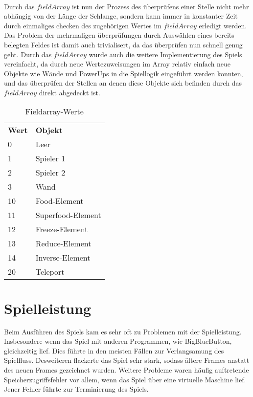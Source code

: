 \\
Durch das $fieldArray$ ist nun der Prozess des {\"u}berpr{\"u}fens einer Stelle nicht mehr abh{\"a}ngig von der L{\"a}nge der Schlange, sondern kann immer in konstanter Zeit durch einmaliges checken des zugeh{\"o}rigen Wertes im $fieldArray$ erledigt werden. Das Problem der mehrmaligen {\"u}berpr{\"u}fungen durch Ausw{\"a}hlen eines bereits belegten Feldes ist damit auch trivialisert, da das {\"u}berpr{\"u}fen nun schnell genug geht. Durch das $fieldArray$ wurde auch die weitere Implementierung des Spiels vereinfacht, da durch neue Wertezuweisungen im Array relativ einfach neue Objekte wie W{\"a}nde und PowerUps in die Spiellogik eingef{\"u}hrt werden konnten, und das {\"u}berpr{\"u}fen der Stellen an denen diese Objekte sich befinden durch das $fieldArray$ direkt abgedeckt ist.
%

\begin{table}
     \centering
     \begin{tabular}{ll}
       \textbf{Wert}  & \textbf{Objekt} \\
       0          & Leer                 \\
       1         & Spieler 1             \\
       2         & Spieler 2             \\
       3         & Wand                 \\
       10        & Food-Element             \\
       11        & Superfood-Element             \\
       12        & Freeze-Element             \\
       13        & Reduce-Element             \\
       14        & Inverse-Element             \\
       20        & Teleport             \\
     \end{tabular}

     \caption{Fieldarray-Werte}
     \label{tbl:Fieldarray-Werte}

   \end{table}




%
\section{Spielleistung}
\label{Spielleistung}
%
Beim Ausf{\"u}hren des Spiels kam es sehr oft zu Problemen mit der Spielleistung. Insbesondere wenn das Spiel mit anderen Programmen, wie BigBlueButton, gleichzeitig lief. Dies f{\"u}hrte in den meisten F{\"a}llen zur Verlangsamung des Spielfluss. Desweiteren flackerte das Spiel sehr stark, sodass {\"a}ltere Frames anstatt des neuen Frames gezeichnet wurden. Weitere Probleme waren h{\"a}ufig auftretende Speicherzugriffsfehler vor allem, wenn das Spiel {\"u}ber eine virtuelle Maschine lief. Jener Fehler f{\"u}hrte zur Terminierung des Spiels.  
%
